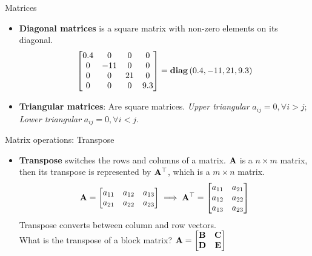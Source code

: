 \documentclass[aspectratio=169]{beamer}
\let\olditem\item
\renewcommand{\item}{\setlength{\itemsep}{\fill}\olditem}
\def\mf{\ensuremath\mathbf}
\begin{document}
\begin{frame}[t]{Matrices}
\begin{itemize}

\item \textbf{Diagonal matrices} is a square matrix with non-zero elements on its diagonal.
$$\begin{bmatrix}
0.4 & 0 & 0 & 0\\
0 & -11 & 0 & 0\\
0 & 0 & 21 & 0\\
0 & 0 & 0 & 9.3\\
\end{bmatrix} = \text{\textbf{diag}}\left(0.4, -11, 21, 9.3\right)$$
\item \textbf{Triangular matrices}: Are square matrices. \textit{Upper triangular} $a_{ij} = 0, \forall i > j$; \textit{Lower triangular} $a_{ij} = 0, \forall i < j$.
\end{itemize}
\end{frame}

\begin{frame}[t]{Matrix operations: Transpose}
\begin{itemize}
\item \textbf{Transpose} switches the rows and columns of a matrix. $\mf{A}$ is a $n\times m$ matrix, then its transpose is represented by $\mf{A}^{\top}$, which is a $m \times n$ matrix.
\[ \mf{A} = \begin{bmatrix}
a_{11} & a_{12} & a_{13}\\
a_{21} & a_{22} & a_{23}\\
\end{bmatrix} \implies \mf{A}^{\top} = \begin{bmatrix}
a_{11} & a_{21}\\
a_{12} & a_{22}\\
a_{13} & a_{23}\\
\end{bmatrix} \]
Transpose converts between column and row vectors.\\
What is the transpose of a block matrix? $\mf{A} = \begin{bmatrix}
\mf{B} & \mf{C}\\\mf{D} & \mf{E}
\end{bmatrix}$
\end{itemize}
\end{frame}
\end{document}
